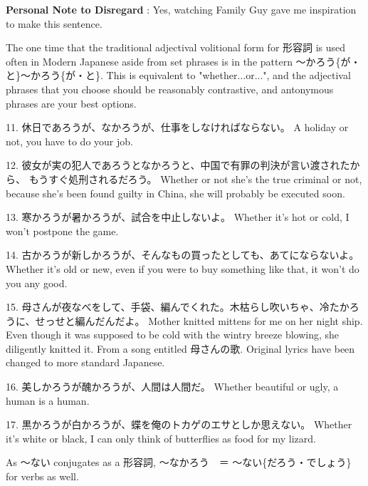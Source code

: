 \par{\textbf{Personal Note to Disregard }: Yes, watching Family Guy gave me inspiration to make this sentence. }

\par{ The one time that the traditional adjectival volitional form for 形容詞 is used often in Modern Japanese aside from set phrases is in the pattern ～かろう\{が・と\}～かろう\{が・と\}. This is equivalent to "whether\dothyp{}\dothyp{}\dothyp{}or\dothyp{}\dothyp{}\dothyp{}", and the adjectival phrases that you choose should be reasonably contrastive, and antonymous phrases are your best options. }

\par{11. 休日であろうが、なかろうが、仕事をしなければならない。 \hfill\break
A holiday or not, you have to do your job. }

\par{12. 彼女が実の犯人であろうとなかろうと、中国で有罪の判決が言い渡されたから、 もうすぐ処刑されるだろう。 \hfill\break
Whether or not she's the true criminal or not, because she's been found guilty in China, she will probably be executed soon. }

\par{13. 寒かろうが暑かろうが、試合を中止しないよ。 \hfill\break
Whether it's hot or cold, I won't postpone the game. }

\par{14. 古かろうが新しかろうが、そんなもの買ったとしても、あてにならないよ。 \hfill\break
Whether it's old or new, even if you were to buy something like that, it won't do you any good. }

\par{15. 母さんが夜なべをして、手袋、編んでくれた。木枯らし吹いちゃ、冷たかろうに、せっせと編んだんだよ。 \hfill\break
Mother knitted mittens for me on her night ship. Even though it was supposed to be cold with the wintry breeze blowing, she diligently knitted it. \hfill\break
From a song entitled 母さんの歌. Original lyrics have been changed to more standard Japanese. }

\par{16. 美しかろうが醜かろうが、人間は人間だ。 \hfill\break
Whether beautiful or ugly, a human is a human. }

\par{17. 黒かろうが白かろうが、蝶を俺のトカゲのエサとしか思えない。 \hfill\break
Whether it's white or black, I can only think of butterflies as food for my lizard. }

\par{ As ～ない conjugates as a 形容詞, ～なかろう　＝ ～ない\{だろう・でしょう\} for verbs as well. }

